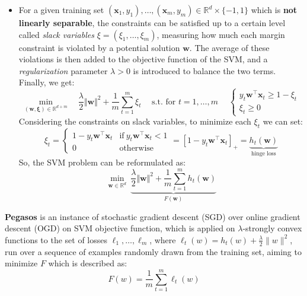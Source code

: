 \begin{itemize}
    \item For a given training set $(\boldsymbol{x}_1, y_1), \dots, (\boldsymbol{x}_m, y_m) \in \mathbb{R}^d \times \{-1, 1\}$ which is \textbf{not linearly separable}, the constraints can be satisfied up to a certain level called \textit{slack variables} $\xi = (\xi_1, \dots, \xi_m)$, measuring how much each margin constraint is violated by a potential solution $\boldsymbol{w}$. The average of these violations is then added to the objective function of the SVM, and a \textit{regularization} parameter $\lambda > 0$ is introduced to balance the two terms. Finally, we get:
    \begin{equation}
        \underset{(\boldsymbol{w}, \boldsymbol{\xi}) \in \mathbb{R}^{d+m}}{\min} \quad  \frac{\lambda}{2} \Vert \boldsymbol{w} \Vert^2 + \frac{1}{m} \sum_{t = 1}^m \xi_t \hspace{15pt}
        \text{s.t. for } t = 1, \dots, m \hspace{15pt}
        \begin{cases}
            y_t \boldsymbol{w}^\top \boldsymbol{x}_t \geq 1 - \xi_t \\
            \xi_t \geq 0
        \end{cases}
    \end{equation}
    Considering the constraints on slack variables, to minimize each $\xi_t$ we can set:
    \begin{equation}
        \xi_t =
        \begin{cases}
            1 - y_t \boldsymbol{w}^\top \boldsymbol{x}_t & \text{if} \ y_t \boldsymbol{w}^\top \boldsymbol{x}_t < 1 \\                
            0 & \text{otherwise}
        \end{cases}
        = \left[1 - y_t \boldsymbol{w}^\top \boldsymbol{x}_t \right]_+
        = \underbrace{h_{t}(\boldsymbol{w})}_{\text{hinge loss}}
    \end{equation}
    So, the SVM problem can be reformulated as:
    \begin{equation}
        \underset{\boldsymbol{w} \in \mathbb{R}^d}{\min} \ \underbrace{\frac{\lambda}{2} \Vert \boldsymbol{w} \Vert^2 + \frac{1}{m} \sum_{t = 1}^m h_{t}(\boldsymbol{w})}_{F(\boldsymbol{w})}
    \end{equation}
\end{itemize}

\textbf{Pegasos} is an instance of stochastic gradient descent (SGD) over online gradient descent (OGD) on SVM objective function, which is applied on $\lambda$-strongly convex functions to the set of losses $\ell_1,\dots,\ell_m$, where $\ell_t(w) = h_t(w) + \frac{\lambda}{2} \|w\|^2$, run over a sequence of examples randomly drawn from the training set, aiming to minimize $F$ which is described as:
\begin{equation}
    F(w) = \frac{1}{m} \sum_{t=1}^{m} \ell_t(w)
\end{equation}

